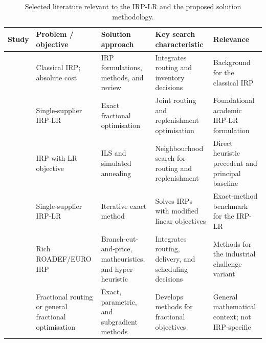 \documentclass{article}
\begin{document}
\begin{table}[!htbp]
\centering
\caption{Selected literature relevant to the IRP-LR and the proposed
solution methodology.}
\label{tab:literature_irplr}
\scriptsize
\renewcommand{\arraystretch}{1.08}
\setlength{\tabcolsep}{3pt}

\begin{tabularx}{\textwidth}{
>{\raggedright\arraybackslash}p{2.15cm}
>{\raggedright\arraybackslash}p{2.55cm}
>{\raggedright\arraybackslash}p{2.75cm}
>{\raggedright\arraybackslash}X
>{\raggedright\arraybackslash}X}
\toprule
\textbf{Study}
&
\textbf{Problem / objective}
&
\textbf{Solution approach}
&
\textbf{Key search characteristic}
&
\textbf{Relevance}
\\
\midrule

\cite{archetti2012hybrid,archetti2016inventory,bertazzi2012inventory,coelho2014thirty}
&
Classical IRP; absolute cost
&
IRP formulations, methods, and review
&
Integrates routing and inventory decisions
&
Background for the classical IRP
\\

\cite{archetti2017logistic}
&
Single-supplier IRP-LR
&
Exact fractional optimisation
&
Joint routing and replenishment optimisation
&
Foundational academic IRP-LR formulation
\\

\cite{alvarez2018iterated}
&
IRP with LR objective
&
ILS and simulated annealing
&
Neighbourhood search for routing and replenishment
&
Direct heuristic precedent and principal baseline
\\

\cite{archetti2019exact}
&
Single-supplier IRP-LR
&
Iterative exact method
&
Solves IRPs with modified linear objectives
&
Exact-method benchmark for the IRP-LR
\\

\cite{absi2020branch,su2020matheuristic,he2020fixedsequence,kheiri2020heuristic,andre2020roadef}
&
Rich ROADEF/EURO IRP
&
Branch-cut-and-price, matheuristics, and hyper-heuristic
&
Integrates routing, delivery, and scheduling decisions
&
Methods for the industrial challenge variant
\\

\cite{baldacci2020fractional,dinkelbach1967,prangprakhon2026subgradient}
&
Fractional routing or general fractional optimisation
&
Exact, parametric, and subgradient methods
&
Develops methods for fractional objectives
&
General mathematical context; not IRP-specific
\\


\end{tabularx}
\end{table}
\end{document}
